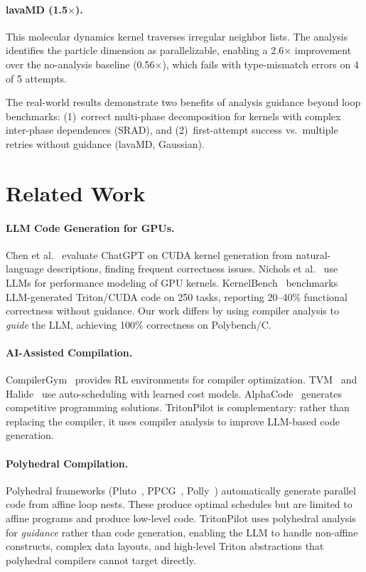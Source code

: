 \documentclass[sigconf]{acmart}
\newcommand{\sysname}{TritonPilot\xspace}
\begin{document}
\paragraph{lavaMD (1.5$\times$).}
This molecular dynamics kernel traverses irregular neighbor lists.
The analysis identifies the particle dimension as parallelizable,
enabling a 2.6$\times$ improvement over the no-analysis baseline
(0.56$\times$), which fails with type-mismatch errors on 4 of 5
attempts.

The real-world results demonstrate two benefits of analysis guidance
beyond loop benchmarks: (1)~correct multi-phase decomposition for
kernels with complex inter-phase dependences (SRAD), and
(2)~first-attempt success vs.\ multiple retries without guidance
(lavaMD, Gaussian).


\section{Related Work}
\label{sec:related}

\paragraph{LLM Code Generation for GPUs.}
Chen et al.~\cite{chen2024chatgpt} evaluate ChatGPT on CUDA kernel
generation from natural-language descriptions, finding frequent
correctness issues.  Nichols et al.~\cite{nichols2024modeling} use LLMs
for performance modeling of GPU kernels.
KernelBench~\cite{ouyang2024kernelbench} benchmarks LLM-generated
Triton/CUDA code on 250 tasks, reporting 20--40\% functional
correctness without guidance.  Our work differs by using compiler
analysis to \emph{guide} the LLM, achieving 100\% correctness on
Polybench/C.

\paragraph{AI-Assisted Compilation.}
CompilerGym~\cite{cummins2022compilergym} provides RL environments for
compiler optimization.  TVM~\cite{chen2018tvm} and
Halide~\cite{ragan2013halide} use auto-scheduling with learned cost
models.  AlphaCode~\cite{li2022alphacode} generates competitive
programming solutions.  \sysname is complementary: rather than
replacing the compiler, it uses compiler analysis to improve LLM-based
code generation.

\paragraph{Polyhedral Compilation.}
Polyhedral frameworks (Pluto~\cite{bondhugula2008pluto},
PPCG~\cite{verdoolaege2013ppcg}, Polly~\cite{grosser2012polly})
automatically generate parallel code from affine loop nests.  These
produce optimal schedules but are limited to affine programs and
produce low-level code.  \sysname uses polyhedral analysis for
\emph{guidance} rather than code generation, enabling the LLM to handle
non-affine constructs, complex data layouts, and high-level Triton
abstractions that polyhedral compilers cannot target directly.
\end{document}
